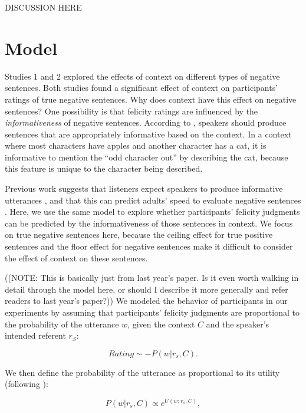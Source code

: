 \documentclass[10pt,letterpaper]{article}
\begin{document}
DISCUSSION HERE


\section{Model}

Studies 1 and 2 explored the effects of context on different types of negative sentences.  Both studies found a significant effect of context on participants' ratings of true negative sentences.  Why does context have this effect on negative sentences?  One possibility is that felicity ratings are influenced by the \emph{informativeness} of negative sentences.  According to , speakers should produce sentences that are appropriately informative based on the context.  In a context where most characters have apples and another character has a cat, it is informative to mention the ``odd character out'' by describing the cat, because this feature is unique to the character being described.

Previous work suggests that listeners expect speakers to produce informative utterances \cite{frank2012}, and that this can predict adults' speed to evaluate negative sentences \cite{nordmeyer2013}.  Here, we use the same model to explore whether participants' felicity judgments can be predicted by the informativeness of those sentences in context.  We focus on true negative sentences here, because the ceiling effect for true positive sentences and the floor effect for negative sentences make it difficult to consider the effect of context on these sentences.  

((NOTE: This is basically just from last year's paper.  Is it even worth walking in detail through the model here, or should I describe it more generally and refer readers to last year's paper?))
We modeled the behavior of participants in our experiments by assuming that participants' felicity judgments are proportional to the probability of the utterance $w$, given the context $C$ and the speaker's intended referent $r_S$:

\begin{equation}\label{eq:surprise}
Rating \sim -P(w| r_s, C).
\end{equation}

\noindent We then define the probability of the utterance as proportional to its utility (following ):

\begin{equation}\label{eq:pw1}
P(w | r_s, C) \propto  e^{U(w;r_s,C)},
\end{equation} 
\end{document}
